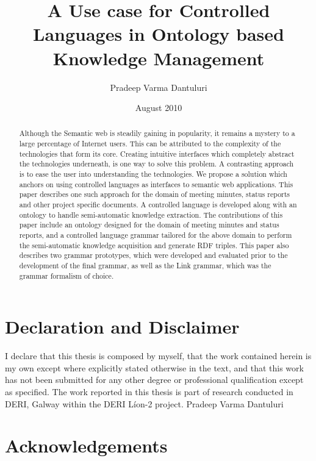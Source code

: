 \documentclass[a4paper]{report}
\begin{document}
\title{A Use case for Controlled Languages in Ontology based Knowledge Management}

\author{Pradeep Varma Dantuluri}
\date{August 2010}

\maketitle

\tableofcontents
\listoffigures
\listoftables

\chapter*{Declaration and Disclaimer}
I declare that this thesis is composed by myself, that the work contained herein is my own except where explicitly stated otherwise in the text, and that this work has not been submitted for any other degree or professional qualification except as specified.
The work reported in this thesis is part of research conducted in DERI, Galway within the DERI L\'{i}on-2 project.
Pradeep Varma Dantuluri

\chapter*{Acknowledgements}

\begin{abstract}
Although the Semantic web is steadily gaining in popularity, it remains a mystery to a large percentage of Internet users. This can be attributed to the complexity of the technologies that form its core. Creating intuitive interfaces which completely abstract the technologies underneath, is one way to solve this problem. A contrasting approach is to ease the user into understanding the technologies. We propose a solution which anchors on using controlled languages as interfaces to semantic web applications. This paper describes one such approach for the domain of meeting minutes, status reports and other project specific documents. A controlled language is developed along with an ontology to handle semi-automatic knowledge extraction. The contributions of this paper include an ontology designed for the domain of meeting minutes and status reports, and a controlled language grammar tailored for the above domain to perform the semi-automatic knowledge acquisition and generate RDF triples. This paper also describes two grammar prototypes, which were developed and evaluated prior to the development of the final grammar, as well as the Link grammar, which was the grammar formalism of choice. 
\end{abstract}















\end{document}
